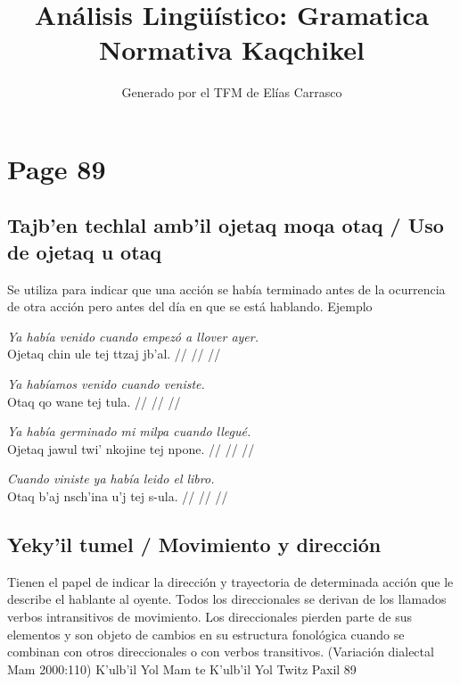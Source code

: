 \documentclass{article}%
\title{Análisis Lingüístico: Gramatica Normativa Kaqchikel}%
\author{Generado por el TFM de Elías Carrasco}%
\begin{document}
%
\normalsize%
\maketitle%
\section{Page 89}%
\label{sec:Page89}%
\subsection{Tajb’en techlal amb’il ojetaq moqa otaq / Uso de ojetaq u otaq}%
\label{subsec:Tajbentechlalambilojetaqmoqaotaq/Usodeojetaquotaq}%

%
Se utiliza para indicar que una acción se había terminado antes %
de la ocurrencia de otra acción pero antes del día en que se %
está hablando. %
Ejemplo %
\par\medskip%
\ex
\textit{Ya había venido cuando empezó a llover ayer.} \\
\begingl
\gla Ojetaq chin ule tej ttzaj jb’al. //
\glb  //
\glc  //
\endgl
\xe
%
\medskip%
\par\medskip%
\ex
\textit{Ya habíamos venido cuando veniste.} \\
\begingl
\gla Otaq qo wane tej tula. //
\glb  //
\glc  //
\endgl
\xe
%
\medskip%
\par\medskip%
\ex
\textit{Ya había germinado mi milpa cuando llegué.} \\
\begingl
\gla Ojetaq jawul twi’ nkojine tej npone. //
\glb  //
\glc  //
\endgl
\xe
%
\medskip%
\par\medskip%
\ex
\textit{Cuando viniste ya había leido el libro.} \\
\begingl
\gla Otaq b’aj nsch’ina u’j tej s-ula. //
\glb  //
\glc  //
\endgl
\xe
%
\medskip%
\subsection{Yeky’il tumel / Movimiento y dirección}%
\label{subsec:Yekyiltumel/Movimientoydireccin}%

%
Tienen el papel de indicar la dirección y trayectoria de determinada acción que le describe el hablante al oyente. Todos los direccionales se derivan de los llamados verbos intransitivos de movimiento. Los direccionales pierden parte de sus elementos y son objeto de cambios en su estructura fonológica cuando se combinan con otros direccionales o con verbos transitivos. (Variación dialectal Mam 2000:110) %
K’ulb’il Yol Mam te K’ulb’il Yol Twitz Paxil 89 

%
\end{document}
